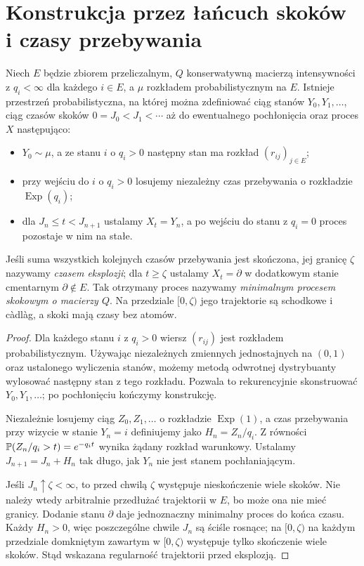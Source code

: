 \section{Konstrukcja przez łańcuch skoków i czasy przebywania}
\begin{twierdzenie}
\label{thm:jump-construction}
Niech $E$ będzie zbiorem przeliczalnym, $Q$ konserwatywną
macierzą intensywności z $q_i<\infty$ dla każdego $i\in E$,
a $\mu$ rozkładem probabilistycznym na $E$.
Istnieje przestrzeń probabilistyczna, na której można
zdefiniować ciąg stanów $Y_0,Y_1,\ldots$, ciąg czasów skoków
$0=J_0<J_1<\cdots$ aż do ewentualnego pochłonięcia oraz
proces $X$ następująco:
\begin{itemize}
\item $Y_0\sim\mu$, a ze stanu $i$ o $q_i>0$ następny stan
ma rozkład $(r_{ij})_{j\in E}$;
\item przy wejściu do $i$ o $q_i>0$ losujemy niezależny
czas przebywania o rozkładzie $\operatorname{Exp}(q_i)$;
\item dla $J_n\le t<J_{n+1}$ ustalamy $X_t=Y_n$,
a po wejściu do stanu z $q_i=0$ proces pozostaje w nim na stałe.
\end{itemize}
Jeśli suma wszystkich kolejnych czasów przebywania jest skończona,
jej granicę $\zeta$ nazywamy \emph{czasem eksplozji}; dla $t\ge\zeta$
ustalamy $X_t=\partial$ w dodatkowym stanie cmentarnym
$\partial\notin E$. Tak otrzymany proces nazywamy
\emph{minimalnym procesem skokowym o macierzy $Q$}.
Na przedziale $[0,\zeta)$ jego trajektorie są schodkowe i
c\`adl\`ag, a skoki mają czasy bez atomów.
\end{twierdzenie}
\begin{proof}
Dla każdego stanu $i$ z $q_i>0$ wiersz $(r_{ij})$ jest
rozkładem probabilistycznym. Używając niezależnych zmiennych
jednostajnych na $(0,1)$ oraz ustalonego wyliczenia stanów,
możemy metodą odwrotnej dystrybuanty wylosować następny stan
z tego rozkładu. Pozwala to rekurencyjnie skonstruować
$Y_0,Y_1,\ldots$; po pochłonięciu kończymy konstrukcję.

Niezależnie losujemy ciąg $Z_0,Z_1,\ldots$ o rozkładzie
$\operatorname{Exp}(1)$, a czas przebywania przy wizycie
w stanie $Y_n=i$ definiujemy jako $H_n=Z_n/q_i$.
Z równości
$\mathbb{P}(Z_n/q_i>t)=e^{-q_i t}$ wynika żądany rozkład
warunkowy. Ustalamy $J_{n+1}=J_n+H_n$ tak długo, jak
$Y_n$ nie jest stanem pochłaniającym.

Jeśli $J_n\uparrow\zeta<\infty$, to przed chwilą $\zeta$
występuje nieskończenie wiele skoków. Nie należy wtedy
arbitralnie przedłużać trajektorii w $E$, bo może ona nie
mieć granicy. Dodanie stanu $\partial$ daje jednoznaczny
minimalny proces do końca czasu. Każdy $H_n>0$, więc
poszczególne chwile $J_n$ są ściśle rosnące; na $[0,\zeta)$
na każdym przedziale domkniętym zawartym w $[0,\zeta)$
występuje tylko skończenie wiele skoków. Stąd wskazana
regularność trajektorii przed eksplozją.
\end{proof}

